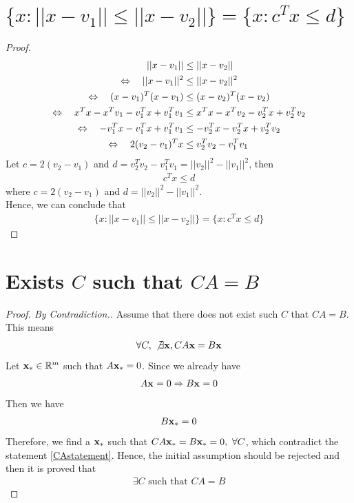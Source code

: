 \documentclass[11pt,a4paper]{article}
\begin{document}
\section{$\{x: ||x-v_1|| \leq ||x-v_2||\} = \{x: c^T x \leq d\}$}
\begin{proof}
    \begin{align}
      \hspace{0.5cm} || x - v_1 || &\leq || x - v_2|| \\
    \Leftrightarrow  \hspace{0.35cm} || x - v_1 ||^2 &\leq || x - v_2||^2 \\
    \Leftrightarrow  \hspace{0.35cm} (x-v_1)^T (x-v_1) &\leq (x - v_2)^T(x - v_2) \\
    \Leftrightarrow  \hspace{0.35cm} 
    x^Tx-x^Tv_1-v_1^Tx+v_1^Tv_1 &\leq x^Tx-x^Tv_2-v_2^Tx+v_2^Tv_2 \\
    \Leftrightarrow  \hspace{0.35cm}
    -v_1^Tx-v_1^Tx+v_1^Tv_1 &\leq -v_2^Tx-v_2^Tx+v_2^Tv_2 \\
    \Leftrightarrow  \hspace{0.35cm}
    2(v_2-v_1)^Tx &\leq v_2^Tv_2 - v_1^Tv_1
    \end{align}
    Let $c = 2(v_2-v_1)$ and 
    $d = v_2^Tv_2 - v_1^Tv_1 = ||v_2||^2 - ||v_1||^2$, then
    \begin{align}
      c^Tx \leq d
    \end{align}
    where $c = 2(v_2-v_1)$ and $d = ||v_2||^2 - ||v_1||^2$. \\
    Hence, we can conclude that 
    \begin{align}
        \{x: ||x-v_1|| \leq ||x-v_2||\} = \{x: c^T x \leq d\}
    \end{align}
\end{proof}

\newpage
\setcounter{section}{7}
\section{Exists $C$ such that $CA = B$}
\begin{proof}[Proof. By Contradiction.]
    Assume that there does not exist such $C$ that $CA = B$. This means 
    \begin{align} \label {CAstatement}
        \forall C,\ \not \exists \mathbf{x}, CA\mathbf{x} = B\mathbf{x}
    \end{align}
    Let $\mathbf{x}_{*} \in \mathbb{R}^{m}$ such that $A\mathbf{x}_{*}=0$. Since we already have
    \begin{align} 
        A\mathbf{x}_{} = 0 \Rightarrow  B\mathbf{x}_{} = 0
    \end{align}
    Then we have 
    \begin{align} 
        B\mathbf{x}_{*} = 0
    \end{align}
    Therefore, we find a $\mathbf{x}_{*}$ such that $CA\mathbf{x}_{*} = B\mathbf{x}_{*} = 0,\ \forall C$,
    which contradict the statement \eqref{CAstatement}. Hence, the initial
    assumption should be rejected and then it is proved that 
    \begin{align}
        \exists C \text{ such that } CA = B
    \end{align}
\end{proof}
\end{document}
